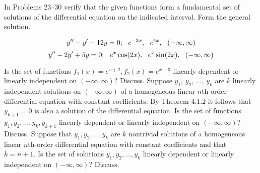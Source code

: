 \documentclass[12pt]{report}
\begin{document}

In Problems 23--30 verify that the given functions form a fundamental set of solutions of the differential equation on the indicated interval. Form the general solution.

\begin{enumerate}[label=\arabic*.,start=23]
     \[ y'' - y' - 12y = 0;\mbox{{ }{ }} e^{-3x},\mbox{{ }{ }} e^{4x},\mbox{{ }{ }} (-\infty, \infty) \]					%
	\setcounter{enumi}{24}
	 \[ y'' - 2y' + 5y = 0;\mbox{{ }{ }} e^{x}\cos(2x), \mbox{{ }{ }} e^{x}\sin(2x),\mbox{{ }{ }} (-\infty, \infty) \]	%
\end{enumerate}

\begin{enumerate}[label=\arabic*.,start=40]
     Is the set of functions $f_{1}(x) = e^{x+2}, f_{2}(x) = e^{x-3}$ linearly dependent or linearly independent on $(-\infty, \infty)$? Discuss. %
	 Suppose $y_{1}$, $y_{2}$, $\dots$, $y_{k}$ are $k$ linearly independent solutions on $(-\infty, \infty)$ of a homogeneous linear $n$th-order differential equation with constant coefficients. By Theorem 4.1.2 it follows that $y_{k+1}=0$ is also a solution of the differential equation. Is the set of functions $y_{1}, y_{2}, \dots, y_{k}, y_{k+1}$ linearly dependent or linearly independent on $(-\infty, \infty)$? Discuss. %
	 Suppose that $y_{1}, y_{2}, \dots, y_{k}$ are $k$ nontrivial solutions of a homogeneous linear $n$th-order differential equation with constant coefficients and that $k=n+1$. Is the set of solutions $y_{1}, y_{2}, \dots, y_{k}$ linearly dependent or linearly independent on $(-\infty, \infty)$? Discuss. %
\end{enumerate}
\end{document}
